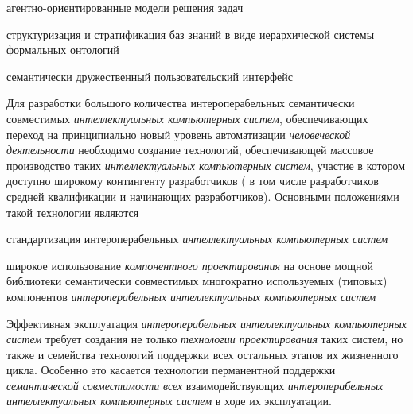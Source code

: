 \begin{textitemize}
\begin{textitemize}
		\item агентно-ориентированные модели решения задач
		\item структуризация и стратификация баз знаний в виде иерархической системы формальных онтологий
		\item семантически дружественный пользовательский интерфейс
	\end{textitemize}
	\item Для разработки большого количества интероперабельных семантически совместимых \textit{интеллектуальных компьютерных систем}, обеспечивающих переход на принципиально новый уровень автоматизации \textit{человеческой деятельности} необходимо создание технологий, обеспечивающей массовое производство таких \textit{интеллектуальных компьютерных систем}, участие в котором доступно широкому контингенту разработчиков ( в том числе разработчиков средней квалификации и начинающих разработчиков). Основными положениями такой технологии являются
	\begin{textitemize}
		\item стандартизация интероперабельных \textit{интеллектуальных компьютерных систем}
		\item широкое использование \textit{компонентного проектирования} на основе мощной библиотеки семантически совместимых многократно используемых (типовых) компонентов \textit{интероперабельных интеллектуальных компьютерных систем}
	\end{textitemize}
	\item Эффективная эксплуатация \textit{интероперабельных интеллектуальных компьютерных систем} требует создания не только \textit{технологии проектирования} таких систем, но также и семейства технологий поддержки всех остальных этапов их жизненного цикла. Особенно это касается технологии перманентной поддержки \textit{семантической совместимости} \textit{всех} взаимодействующих \textit{интероперабельных интеллектуальных компьютерных систем} в ходе их эксплуатации.
\end{textitemize}

%